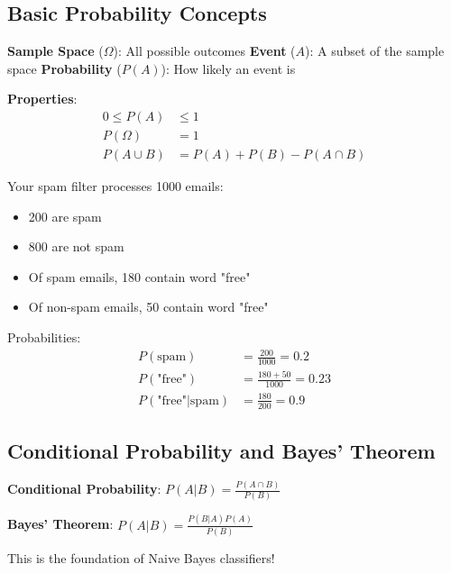 \documentclass{article}
\newcounter{example}
\begin{document}
\subsection{Basic Probability Concepts}

\textbf{Sample Space} ($\Omega$): All possible outcomes
\textbf{Event} ($A$): A subset of the sample space
\textbf{Probability} ($P(A)$): How likely an event is

\textbf{Properties}:
\begin{align}
0 \leq P(A) &\leq 1 \\
P(\Omega) &= 1 \\
P(A \cup B) &= P(A) + P(B) - P(A \cap B)
\end{align}

\begin{tcolorbox}[colback=red!5!white,colframe=red!75!black,title=Example \stepcounter{example}\#\theexample: Email Classification]
Your spam filter processes 1000 emails:
\begin{itemize}
    \item 200 are spam
    \item 800 are not spam
    \item Of spam emails, 180 contain word "free"
    \item Of non-spam emails, 50 contain word "free"
\end{itemize}

Probabilities:
\begin{align}
P(\text{spam}) &= \frac{200}{1000} = 0.2 \\
P(\text{"free"}) &= \frac{180 + 50}{1000} = 0.23 \\
P(\text{"free"}|\text{spam}) &= \frac{180}{200} = 0.9
\end{align}
\end{tcolorbox}

\subsection{Conditional Probability and Bayes' Theorem}

\textbf{Conditional Probability}: $P(A|B) = \frac{P(A \cap B)}{P(B)}$

\textbf{Bayes' Theorem}: $P(A|B) = \frac{P(B|A) P(A)}{P(B)}$

This is the foundation of Naive Bayes classifiers!

\begin{center}
\end{center}
\end{document}
